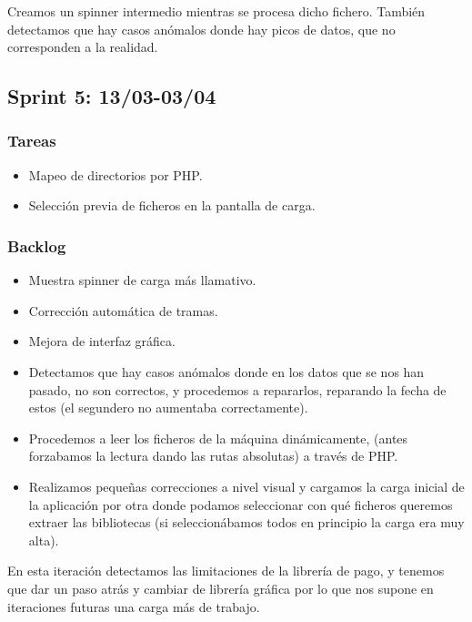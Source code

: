 Creamos un spinner intermedio mientras se procesa dicho fichero. También detectamos que hay casos anómalos donde hay picos de datos, que no corresponden a la realidad.

\subsection{Sprint 5: 13/03-03/04}
\subsubsection{Tareas}

\begin{itemize}
	\item Mapeo de directorios por PHP.

	\item Selección previa de ficheros en la pantalla de carga.


\end{itemize}
\subsubsection{Backlog}
\begin{itemize}
	\item Muestra spinner de carga más llamativo.

	\item Corrección automática de tramas.

	\item Mejora de interfaz gráfica.

	\item Detectamos que hay casos anómalos donde en los datos que se nos han pasado, no son correctos, y procedemos a repararlos, reparando la fecha de estos (el segundero no aumentaba correctamente).

	\item Procedemos a leer los ficheros de la máquina dinámicamente, (antes forzabamos la lectura dando las rutas absolutas) a través de PHP.

	\item Realizamos pequeñas correcciones a nivel visual y cargamos la carga inicial de la aplicación por otra donde podamos seleccionar con qué ficheros queremos extraer las bibliotecas (si seleccionábamos todos en principio la carga era muy alta).

\end{itemize}


En esta iteración detectamos las limitaciones de la librería de pago, y tenemos que dar un paso atrás y cambiar de librería gráfica por lo que nos supone en iteraciones futuras una carga más de trabajo.


